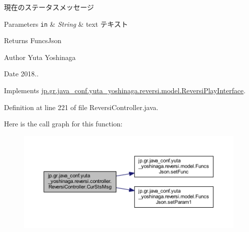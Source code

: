 現在のステータスメッセージ 


\begin{DoxyParams}[1]{Parameters}
\mbox{\tt in}  & {\em String} & text テキスト \\
\hline
\end{DoxyParams}
\begin{DoxyReturn}{Returns}
Funcs\+Json 
\end{DoxyReturn}
\begin{DoxyAuthor}{Author}
Yuta Yoshinaga 
\end{DoxyAuthor}
\begin{DoxyDate}{Date}
2018.. 
\end{DoxyDate}


Implements \hyperlink{interfacejp_1_1gr_1_1java__conf_1_1yuta__yoshinaga_1_1reversi_1_1model_1_1_reversi_play_interface_ae9fe1e8ed6fca483d91b4647d8c86a83}{jp.\+gr.\+java\+\_\+conf.\+yuta\+\_\+yoshinaga.\+reversi.\+model.\+Reversi\+Play\+Interface}.



Definition at line 221 of file Reversi\+Controller.\+java.

Here is the call graph for this function\+:
\nopagebreak
\begin{figure}[H]
\begin{center}
\leavevmode
\includegraphics[width=350pt]{classjp_1_1gr_1_1java__conf_1_1yuta__yoshinaga_1_1reversi_1_1controller_1_1_reversi_controller_a54cfbfa89d25bb2db441473ba53a5140_cgraph}
\end{center}
\end{figure}
\mbox{\label{classjp_1_1gr_1_1java__conf_1_1yuta__yoshinaga_1_1reversi_1_1controller_1_1_reversi_controller_a2303f5dc844932ae026ec80d6323f726}} 
